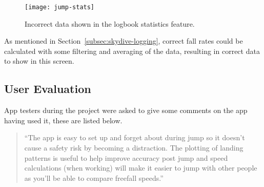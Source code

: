 \begin{figure}[ht]
  \centering
  \texttt{[image: jump-stats]}
  \caption{Incorrect data shown in the logbook statistics feature.}\label{fig:jump-stats}
\end{figure}

As mentioned in Section~\ref{subsec:skydive-logging}, correct fall rates could be calculated with some filtering and averaging of the data, resulting in correct data to show in this screen.

\subsection{User Evaluation}
App testers during the project were asked to give some comments on the app having used it, these are listed below.

\begin{quote}
``The app is easy to set up and forget about during jump so it doesn't cause a safety risk by becoming a distraction. The plotting of landing patterns is useful to help improve accuracy post jump and speed calculations (when working) will make it easier to jump with other people as you'll be able to compare freefall speeds.''
\end{quote}
